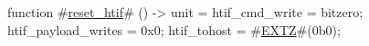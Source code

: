 function #\hyperref[sailRISCVzresetzyhtif]{reset\_htif}# () -> unit = {
  htif_cmd_write = bitzero;
  htif_payload_writes = 0x0;
  htif_tohost = #\hyperref[sailRISCVzEXTZ]{EXTZ}#(0b0);
}
